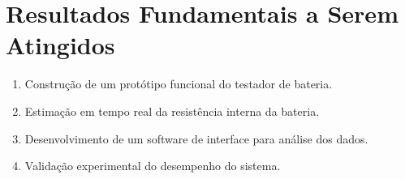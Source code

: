 \chapter{Resultados Fundamentais a Serem Atingidos} \label{cha:resultados}

\begin{enumerate}
    \item Construção de um protótipo funcional do testador de bateria.
    \item Estimação em tempo real da resistência interna da bateria.
    \item Desenvolvimento de um software de interface para análise dos dados.
    \item Validação experimental do desempenho do sistema.
\end{enumerate}
